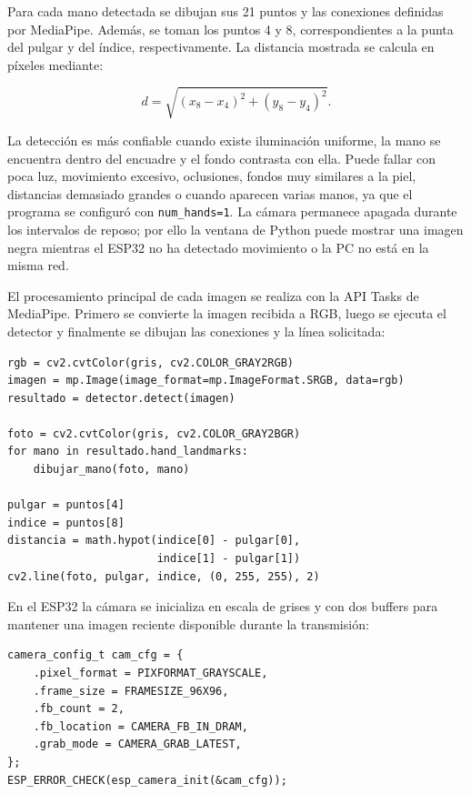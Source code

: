 \documentclass[12pt, letterpaper]{article}
\begin{document}
Para cada mano detectada se dibujan sus 21 puntos y las conexiones definidas
por MediaPipe. Además, se toman los puntos 4 y 8, correspondientes a la punta
del pulgar y del índice, respectivamente. La distancia mostrada se calcula en
píxeles mediante:

\[
    d=\sqrt{(x_8-x_4)^2+(y_8-y_4)^2}.
\]

La detección es más confiable cuando existe iluminación uniforme, la mano se
encuentra dentro del encuadre y el fondo contrasta con ella. Puede fallar con
poca luz, movimiento excesivo, oclusiones, fondos muy similares a la piel,
distancias demasiado grandes o cuando aparecen varias manos, ya que el programa
se configuró con \texttt{num\_hands=1}. La cámara permanece apagada durante los
intervalos de reposo; por ello la ventana de Python puede mostrar una imagen
negra mientras el ESP32 no ha detectado movimiento o la PC no está en la misma
red.

El procesamiento principal de cada imagen se realiza con la API Tasks de
MediaPipe. Primero se convierte la imagen recibida a RGB, luego se ejecuta el
detector y finalmente se dibujan las conexiones y la línea solicitada:

\begin{lstlisting}[style=pythonstyle, caption={Detección y dibujo de los puntos de la mano}, label={lst:mediapipe}]
rgb = cv2.cvtColor(gris, cv2.COLOR_GRAY2RGB)
imagen = mp.Image(image_format=mp.ImageFormat.SRGB, data=rgb)
resultado = detector.detect(imagen)

foto = cv2.cvtColor(gris, cv2.COLOR_GRAY2BGR)
for mano in resultado.hand_landmarks:
	dibujar_mano(foto, mano)

pulgar = puntos[4]
indice = puntos[8]
distancia = math.hypot(indice[0] - pulgar[0],
					   indice[1] - pulgar[1])
cv2.line(foto, pulgar, indice, (0, 255, 255), 2)
\end{lstlisting}

En el ESP32 la cámara se inicializa en escala de grises y con dos buffers para
mantener una imagen reciente disponible durante la transmisión:

\begin{lstlisting}[style=cstyle, caption={Configuración de la cámara del ESP32}, label={lst:camera-config}]
camera_config_t cam_cfg = {
	.pixel_format = PIXFORMAT_GRAYSCALE,
	.frame_size = FRAMESIZE_96X96,
	.fb_count = 2,
	.fb_location = CAMERA_FB_IN_DRAM,
	.grab_mode = CAMERA_GRAB_LATEST,
};
ESP_ERROR_CHECK(esp_camera_init(&cam_cfg));
\end{lstlisting}
\end{document}
